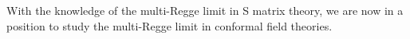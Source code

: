With the knowledge of the multi-Regge limit in S matrix theory, we are now in a position to study the multi-Regge limit in conformal field theories.
%
%
%
%
%
%
%
%
%
%
%
%

